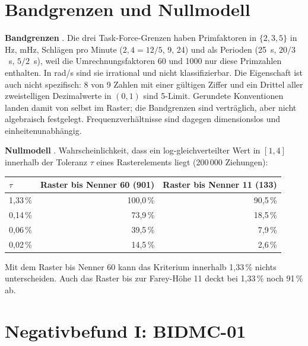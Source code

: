 \section{Bandgrenzen und Nullmodell}\label{sec:360baender}

\textbf{Bandgrenzen} \KM. Die drei Task-Force-Grenzen haben Primfaktoren in
$\{2,3,5\}$ in Hz, mHz, Schlägen pro Minute ($2{,}4=12/5$, 9, 24) und als
Perioden (25~s, $20/3$~s, $5/2$~s), weil die Umrechnungsfaktoren 60 und 1000
nur diese Primzahlen enthalten. In rad/s sind sie irrational und nicht
klassifizierbar. Die Eigenschaft ist auch nicht spezifisch: 8 von 9 Zahlen
mit einer gültigen Ziffer und ein Drittel aller zweistelligen Dezimalwerte
in $(0,1)$ sind 5-Limit. Gerundete Konventionen landen damit von selbst im
Raster; die Bandgrenzen sind verträglich, aber nicht algebraisch festgelegt.
Frequenzverhältnisse sind dagegen dimensionslos und einheitenunabhängig.

\textbf{Nullmodell} \KM. Wahrscheinlichkeit, dass ein log-gleichverteilter
Wert in $[1,4]$ innerhalb der Toleranz $\tau$ eines Rasterelements liegt
(200\,000 Ziehungen):

\begin{center}
\begin{tabular}{@{}lrr@{}}
\toprule
$\tau$ & Raster bis Nenner 60 (901) & Raster bis Nenner 11 (133) \\
\midrule
1{,}33\,\% & 100{,}0\,\% & 90{,}5\,\% \\
0{,}14\,\% & 73{,}9\,\% & 18{,}5\,\% \\
0{,}06\,\% & 39{,}5\,\% & 7{,}9\,\% \\
0{,}02\,\% & 14{,}5\,\% & 2{,}6\,\% \\
\bottomrule
\end{tabular}
\end{center}

Mit dem Raster bis Nenner 60 kann das Kriterium \glqq innerhalb 1{,}33\,\%\grqq{} nichts
unterscheiden. Auch das Raster bis zur Farey-Höhe 11 deckt bei 1{,}33\,\%
noch 91\,\% ab.

\section{Negativbefund I: BIDMC-01}

